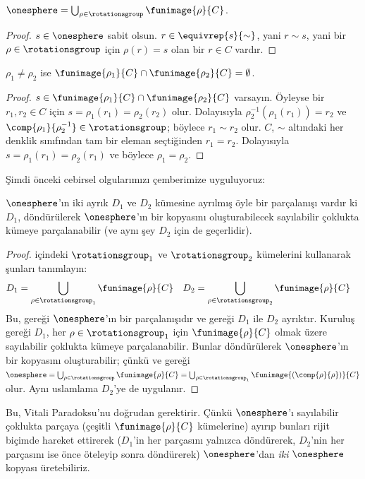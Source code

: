 \documentclass[../../../include/open-logic-section]{subfiles}
\begin{document}
\begin{lem}
$\onesphere = \bigcup_{\rho \in \rotationsgroup} \funimage{\rho}{C}$.
\end{lem}

\begin{proof}
$s\in\onesphere$ sabit olsun. $r\in\equivrep{s}{\sim}$, yani
$r\sim s$, yani bir $\rho\in\rotationsgroup$ için $\rho(r)=s$ olan bir
$r\in C$ vardır.
\end{proof}

\begin{lem}
$\rho_1\neq\rho_2$ ise
$\funimage{\rho_1}{C}\cap\funimage{\rho_2}{C}=\emptyset$.
\end{lem}

\begin{proof}
$s\in\funimage{\rho_1}{C}\cap\funimage{\rho_2}{C}$ varsayın. Öyleyse
bir $r_1,r_2\in C$ için
$s=\rho_1(r_1)=\rho_2(r_2)$ olur. Dolayısıyla
$\rho^{-1}_2(\rho_1(r_1))=r_2$ ve
$\comp{\rho_1}{\rho^{-1}_2}\in\rotationsgroup$; böylece
$r_1\sim r_2$ olur. $C$, $\sim$ altındaki her denklik sınıfından tam bir
eleman seçtiğinden $r_1=r_2$. Dolayısıyla
$s=\rho_1(r_1)=\rho_2(r_1)$ ve böylece $\rho_1=\rho_2$.
\end{proof}

Şimdi önceki cebirsel olgularımızı çemberimize uyguluyoruz:

\begin{lem}
$\onesphere$'ın iki ayrık $D_1$ ve $D_2$ kümesine ayrılmış öyle bir
parçalanışı vardır ki $D_1$, döndürülerek $\onesphere$'ın bir kopyasını
oluşturabilecek sayılabilir çoklukta kümeye parçalanabilir (ve aynı şey
$D_2$ için de geçerlidir).
\end{lem}

\begin{proof}
 içindeki $\rotationsgroup_1$ ve
$\rotationsgroup_2$ kümelerini kullanarak şunları tanımlayın:
\begin{align*}
	D_{1} &= \bigcup_{\rho \in \rotationsgroup_1} \funimage{\rho}{C} &
	D_{2} &= \bigcup_{\rho \in \rotationsgroup_2} \funimage{\rho}{C}
\end{align*}
Bu,  gereği $\onesphere$'ın bir parçalanışıdır ve
 gereği $D_1$ ile $D_2$ ayrıktır. Kuruluş gereği
$D_1$, her $\rho\in\rotationsgroup_1$ için $\funimage{\rho}{C}$ olmak
üzere sayılabilir çoklukta kümeye parçalanabilir. Bunlar döndürülerek
$\onesphere$'ın bir kopyasını oluşturabilir; çünkü
 ve  gereği
$\onesphere=\bigcup_{\rho\in\rotationsgroup}\funimage{\rho}{C}=
\bigcup_{\rho\in\rotationsgroup_1}
\funimage{(\comp{\rho}{\rho})}{C}$ olur. Aynı uslamlama $D_2$'ye de
uygulanır.
\end{proof}\noindent
Bu, Vitali Paradoksu'nu doğrudan gerektirir. Çünkü $\onesphere$'ı
sayılabilir çoklukta parçaya (çeşitli $\funimage{\rho}{C}$ kümelerine)
ayırıp bunları rijit biçimde hareket ettirerek ($D_1$'in her parçasını
yalnızca döndürerek, $D_2$'nin her parçasını ise önce öteleyip sonra
döndürerek) $\onesphere$'dan \emph{iki} $\onesphere$ kopyası üretebiliriz.
\end{document}
